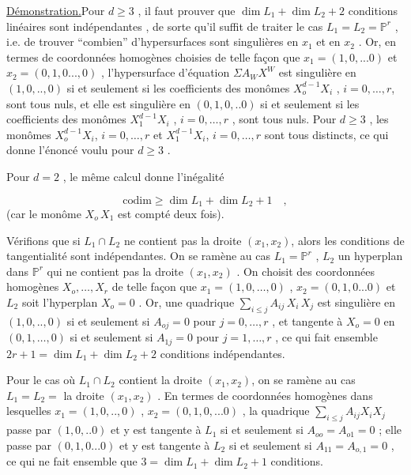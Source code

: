
\underline{Démonstration.}\quad Pour $d \geq 3$ , il faut prouver que $\dim L_1 + \dim L_2+2$ conditions linéaires sont indépendantes , de sorte qu'il suffit de traiter le cas $L_1 = L_2 = \mathbb{P}^r$ , i.e. de trouver ``combien'' d'hypersurfaces sont singulières en $x_1$ et en $x_2$ . Or, en termes de coordonnées homogènes choisies de telle façon que $x_1 = (1,0,...0)$ et $x_2 = (0,1,0...,0)$ , l'hypersurface d'équation $\Sigma A_W X^W$ est singulière en $(1,0,..,0)$ si et seulement si les coefficients des monômes $X_o^{d-1}X_i$ , $i=0,\ldots,r$, sont tous nuls, et elle est singulière en $(0,1,0,..0)$ si et seulement si les coefficients des monômes $X_1^{d-1}X_i$ , $i=0,\ldots,r$ , sont tous nuls. Pour $d \geq 3$ , les monômes $X_o^{d-1}X_i$, $i=0,\ldots,r$ et $X_1^{d-1}X_i$, $i=0,\ldots,r$ sont tous distincts, ce qui donne l'énoncé voulu pour $d \geq 3$ .

Pour $d = 2$ , le même calcul donne l'inégalité

\begin{equation*}
\mathrm{codim} \geq \dim L_1 + \dim L_2 + 1 \quad ,
\end{equation*}
(car le monôme $X_o \, X_1$ est compté deux fois).

Vérifions que si $L_1 \cap L_2$ ne contient pas la droite $(x_1,x_2)$, alors les conditions de tangentialité sont indépendantes. On se ramène au cas $L_1 = \mathbb{P}^r$ , $L_2$ un hyperplan dans $\mathbb{P}^r$ qui ne contient pas la droite $(x_1,x_2)$ . On choisit des coordonnées homogènes $X_o,\ldots,X_r$ de telle façon que $x_1 = (1,0,\ldots,0)$ , $x_2 = (0,1,0...0)$ et $L_2$ soit l'hyperplan $X_o = 0$ . Or, une quadrique $\sum\limits_{i \leq j} A_{ij} \, X_i \, X_j$ est singulière en $(1,0,..,0)$ si et seulement si $A_{oj} = 0$ pour $j = 0,\ldots,r$ , et tangente à
$X_o = 0$ en $(0,1,\ldots,0)$ si et seulement si $A_{1j} = 0$ pour $j = 1,\ldots,r$ , ce qui fait ensemble $2r+1 = \dim L_1 + \dim L_2 + 2$ conditions indépendantes.

Pour le cas où $L_1 \cap L_2$ contient la droite $(x_1,x_2)$, on se ramène au cas $L_1 = L_2 =$ la droite $(x_1,x_2)$ . En termes de coordonnées homogènes dans lesquelles $x_1 = (1,0,..,0)$ , $x_2 = (0,1,0,...0)$ , la quadrique $\sum_{i \leq j} A_{ij} X_i X_j$ passe par $(1,0,..0)$ et y est tangente à $L_1$ si et seulement si $A_{oo} = A_{o1} = 0$ ; elle passe par $(0,1,0...0)$ et y est tangente à $L_2$ si et seulement si $A_{11} = A_{o,1} = 0$ , ce qui ne fait ensemble que $3 = \dim L_1 + \dim L_2 + 1$ conditions.


